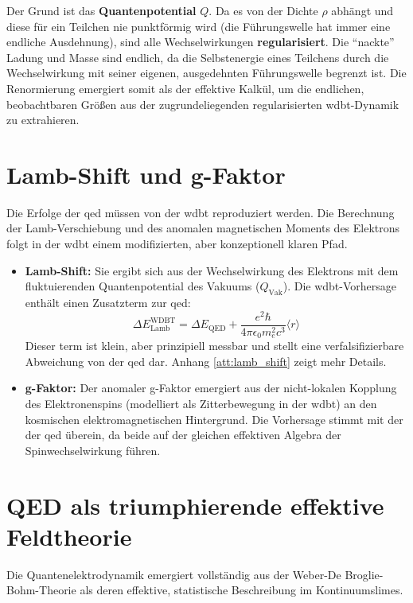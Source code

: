 Der Grund ist das \textbf{Quantenpotential} $Q$. Da es von der Dichte $\rho$ abhängt und diese für ein Teilchen nie punktförmig wird (die Führungswelle hat immer eine endliche Ausdehnung), sind alle
Wechselwirkungen \textbf{regularisiert}. Die \enquote{nackte} Ladung und Masse sind endlich, da die Selbstenergie eines Teilchens durch die Wechselwirkung mit seiner eigenen, ausgedehnten Führungswelle
begrenzt ist. Die Renormierung emergiert somit als der effektive Kalkül, um die endlichen, beobachtbaren Größen aus der zugrundeliegenden regularisierten \gls{wdbt}-Dynamik zu extrahieren.

\section{Lamb-Shift und g-Faktor}
Die Erfolge der \gls{qed} müssen von der \gls{wdbt} reproduziert werden. Die Berechnung der Lamb-Verschiebung und des anomalen magnetischen Moments des Elektrons folgt in der \gls{wdbt} einem
modifizierten, aber konzeptionell klaren Pfad.

\begin{itemize}
    \item \textbf{Lamb-Shift:} Sie ergibt sich aus der Wechselwirkung des Elektrons mit dem fluktuierenden Quantenpotential des Vakuums ($Q_\text{Vak}$). Die \gls{wdbt}-Vorhersage enthält einen Zusatzterm zur \gls{qed}:
    \begin{equation}
        \Delta E_{\text{Lamb}}^{\text{WDBT}} = \Delta E_{\text{QED}} + \frac{e^2 \hbar}{4\pi \epsilon_0 m_e^2 c^3} \langle r \rangle
    \end{equation}
    Dieser term ist klein, aber prinzipiell messbar und stellt eine verfalsifizierbare Abweichung von der \gls{qed} dar. Anhang \ref{att:lamb_shift} zeigt mehr Details.
    \item \textbf{g-Faktor:} Der anomaler g-Faktor emergiert aus der nicht-lokalen Kopplung des Elektronenspins (modelliert als Zitterbewegung in der \gls{wdbt}) an den kosmischen elektromagnetischen Hintergrund. Die Vorhersage stimmt mit der der \gls{qed} überein, da beide auf der gleichen effektiven Algebra der Spinwechselwirkung führen.
\end{itemize}

\section{QED als triumphierende effektive Feldtheorie}
Die Quantenelektrodynamik emergiert vollständig aus der Weber-De Broglie-Bohm-Theorie als deren effektive, statistische Beschreibung im Kontinuumslimes.

